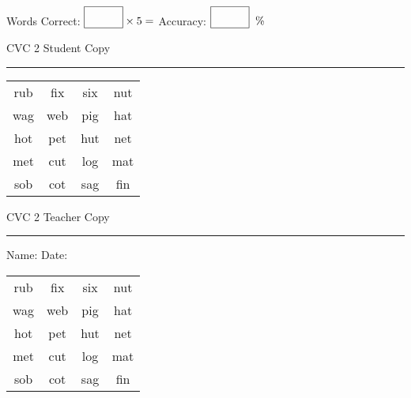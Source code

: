 \documentclass{memoir}
\begin{document}
\normalsize

Words Correct: $\fbox{\phantom{\huge 100}} \times 5 = $ Accuracy: $\fbox{\phantom{\huge 100}}\;\; \%$ 

\vfill

\newpage


\footnotesize \noindent
CVC 2 \hfill Student Copy
\smallskip
\hrule

\huge

\setlength{\tabcolsep}{14pt}
\def\arraystretch{2}

{\selectfont


\begin{vplace}[0.5]
\begin{center}
\begin{tabular}{cccc}
rub & fix & six & nut \\
wag & web & pig & hat \\
hot & pet & hut & net \\
met & cut & log & mat \\
sob & cot & sag & fin \\
\end{tabular}
\end{center}
\end{vplace}

}

\newpage

\footnotesize \noindent
CVC 2 \hfill Teacher Copy
\smallskip
\hrule

\normalsize

\vfill

\noindent
Name: \underline{\hspace{1.75in}} \hfill Date: \underline{\hspace{1in}}

\huge

{\selectfont


\begin{vplace}[0.5]
\begin{center}
\begin{tabular}{cccc}
rub & fix & six & nut \\
wag & web & pig & hat \\
hot & pet & hut & net \\
met & cut & log & mat \\
sob & cot & sag & fin \\
\end{tabular}
\end{center}
\end{vplace}



}
\end{document}
